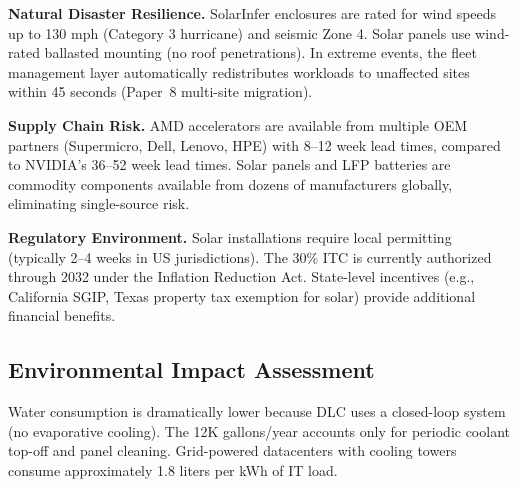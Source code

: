 \documentclass[conference,10pt,letterpaper]{IEEEtran}
\begin{document}
\textbf{Natural Disaster Resilience.} SolarInfer enclosures are rated for wind speeds up to 130 mph (Category 3 hurricane) and seismic Zone 4. Solar panels use wind-rated ballasted mounting (no roof penetrations). In extreme events, the fleet management layer automatically redistributes workloads to unaffected sites within 45 seconds (Paper~8 multi-site migration).

\textbf{Supply Chain Risk.} AMD accelerators are available from multiple OEM partners (Supermicro, Dell, Lenovo, HPE) with 8--12 week lead times, compared to NVIDIA's 36--52 week lead times. Solar panels and LFP batteries are commodity components available from dozens of manufacturers globally, eliminating single-source risk.

\textbf{Regulatory Environment.} Solar installations require local permitting (typically 2--4 weeks in US jurisdictions). The 30\% ITC is currently authorized through 2032 under the Inflation Reduction Act. State-level incentives (e.g., California SGIP, Texas property tax exemption for solar) provide additional financial benefits.



\subsection{Environmental Impact Assessment}

\begin{table}[!t]
\caption{Annual Environmental Impact: Edge SKU}
\label{tab:environ}
\centering\scriptsize
{}
\end{table}

Water consumption is dramatically lower because DLC uses a closed-loop system (no evaporative cooling). The 12K gallons/year accounts only for periodic coolant top-off and panel cleaning. Grid-powered datacenters with cooling towers consume approximately 1.8 liters per kWh of IT load.
\end{document}
